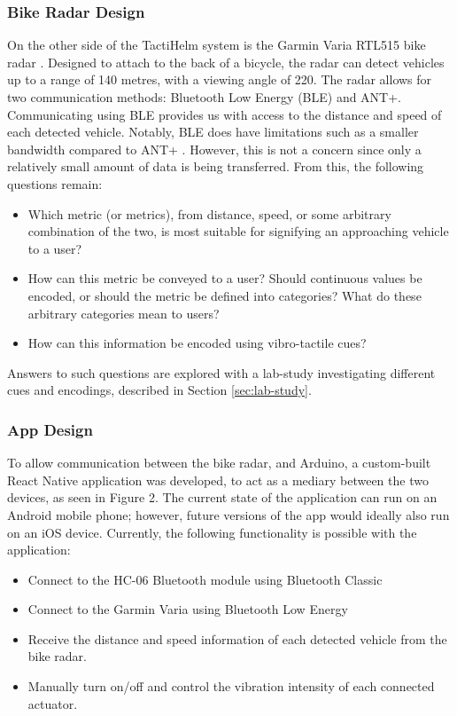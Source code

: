 \documentclass{interim}
\begin{document}
\subsubsection{Bike Radar Design}
On the other side of the TactiHelm system is the Garmin Varia RTL515 bike radar \cite{garminradar}. Designed to attach to the back of a bicycle, the radar can detect vehicles up to a range of 140 metres, with a viewing angle of 220\degree{}. The radar allows for two communication methods: Bluetooth Low Energy (BLE) and ANT+. Communicating using BLE provides us with access to the distance and speed of each detected vehicle. Notably, BLE does have limitations such as a smaller bandwidth compared to ANT+ \cite{bluetoothlimitations}. However, this is not a concern since only a relatively small amount of data is being transferred. From this, the following questions remain:
\begin{itemize}
    \item Which metric (or metrics), from distance, speed, or some arbitrary combination of the two, is most suitable for signifying an approaching vehicle to a user?
    \item How can this metric be conveyed to a user? Should continuous values be encoded, or should the metric be defined into categories? What do these arbitrary categories mean to users? 
    \item How can this information be encoded using vibro-tactile cues?
\end{itemize}
Answers to such questions are explored with a lab-study investigating different cues and encodings, described in Section \ref{sec:lab-study}.


\subsubsection{App Design}
To allow communication between the bike radar, and Arduino, a custom-built React Native application was developed, to act as a mediary between the two devices, as seen in Figure 2. The current state of the application can run on an Android mobile phone; however, future versions of the app would ideally also run on an iOS device. Currently, the following functionality is possible with the application:
\begin{itemize}
    \item Connect to the HC-06 Bluetooth module using Bluetooth Classic
    \item Connect to the Garmin Varia using Bluetooth Low Energy
    \item Receive the distance and speed information of each detected vehicle from the bike radar.
    \item Manually turn on/off and control the vibration intensity of each connected actuator.
\end{itemize}
\end{document}
